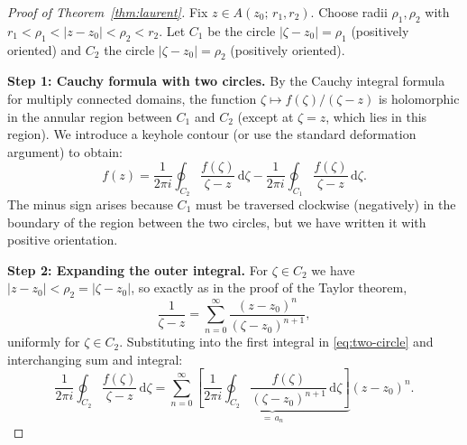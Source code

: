 \documentclass[12pt,a4paper,openany]{book}
\theoremstyle{definition}
\theoremstyle{plain}
\theoremstyle{remark}
\newcommand{\dd}{\mathrm{d}}
\newcommand{\abs}[1]{\left|#1\right|}
\begin{document}
\begin{proof}[Proof of Theorem~\ref{thm:laurent}]
Fix $z\in A(z_0;\,r_1,r_2)$. Choose radii $\rho_1,\rho_2$ with
$r_1<\rho_1<\abs{z-z_0}<\rho_2<r_2$. Let $C_1$ be the circle
$\abs{\zeta-z_0}=\rho_1$ (positively oriented) and $C_2$ the circle
$\abs{\zeta-z_0}=\rho_2$ (positively oriented).

\begin{center}
\end{center}

\medskip\noindent
\textbf{Step 1: Cauchy formula with two circles.}
By the Cauchy integral formula for multiply connected domains, the function
$\zeta\mapsto f(\zeta)/(\zeta-z)$ is holomorphic in the annular region between
$C_1$ and $C_2$ (except at $\zeta=z$, which lies in this region). We introduce a
keyhole contour (or use the standard deformation argument) to obtain:
\begin{equation}\label{eq:two-circle}
  f(z) = \frac{1}{2\pi i}\oint_{C_2}\frac{f(\zeta)}{\zeta-z}\,\dd\zeta
       - \frac{1}{2\pi i}\oint_{C_1}\frac{f(\zeta)}{\zeta-z}\,\dd\zeta.
\end{equation}
The minus sign arises because $C_1$ must be traversed clockwise (negatively) in
the boundary of the region between the two circles, but we have written it with
positive orientation.

\medskip\noindent
\textbf{Step 2: Expanding the outer integral.}
For $\zeta\in C_2$ we have $\abs{z-z_0}<\rho_2=\abs{\zeta-z_0}$, so exactly
as in the proof of the Taylor theorem,
\[
  \frac{1}{\zeta-z} = \sum_{n=0}^{\infty}\frac{(z-z_0)^n}{(\zeta-z_0)^{n+1}},
\]
uniformly for $\zeta\in C_2$. Substituting into the first integral in
\eqref{eq:two-circle} and interchanging sum and integral:
\begin{equation}\label{eq:outer-sum}
  \frac{1}{2\pi i}\oint_{C_2}\frac{f(\zeta)}{\zeta-z}\,\dd\zeta
  = \sum_{n=0}^{\infty}\underbrace{\left[\frac{1}{2\pi i}\oint_{C_2}
    \frac{f(\zeta)}{(\zeta-z_0)^{n+1}}\,\dd\zeta\right]}_{=\,a_n}(z-z_0)^n.
\end{equation}


\end{proof}
\end{document}
